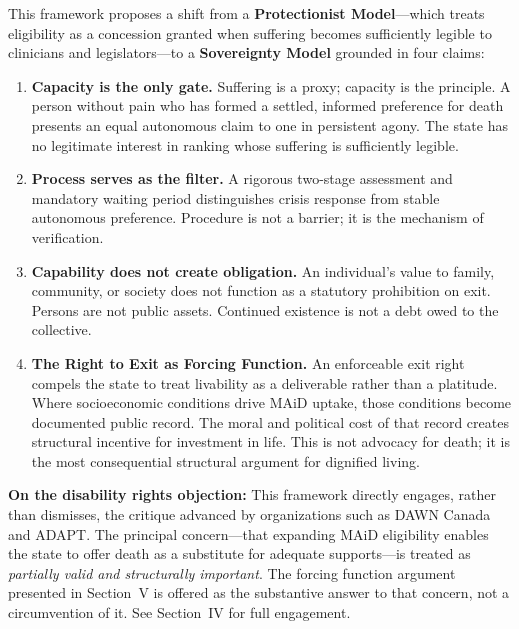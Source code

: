 \documentclass[11pt, letterpaper]{article}
\begin{document}
\medskip
This framework proposes a shift from a \textbf{Protectionist Model}---which treats eligibility
as a concession granted when suffering becomes sufficiently legible to clinicians and
legislators---to a \textbf{Sovereignty Model} grounded in four claims:

\begin{enumerate}
  \item \textbf{Capacity is the only gate.} Suffering is a proxy; capacity is the
    principle. A person without pain who has formed a settled, informed preference for
    death presents an equal autonomous claim to one in persistent agony. The state has
    no legitimate interest in ranking whose suffering is sufficiently legible.

  \item \textbf{Process serves as the filter.} A rigorous two-stage assessment and
    mandatory waiting period distinguishes crisis response from stable autonomous
    preference. Procedure is not a barrier; it is the mechanism of verification.

  \item \textbf{Capability does not create obligation.} An individual's value to
    family, community, or society does not function as a statutory prohibition on exit.
    Persons are not public assets. Continued existence is not a debt owed to the collective.

  \item \textbf{The Right to Exit as Forcing Function.} An enforceable exit right
    compels the state to treat livability as a deliverable rather than a platitude.
    Where socioeconomic conditions drive MAiD uptake, those conditions become documented
    public record. The moral and political cost of that record creates structural
    incentive for investment in life. This is not advocacy for death; it is the most
    consequential structural argument for dignified living.
\end{enumerate}

\begin{tcolorbox}[warningbox]
\textbf{On the disability rights objection:} This framework directly engages, rather than
dismisses, the critique advanced by organizations such as DAWN Canada and ADAPT. The
principal concern---that expanding MAiD eligibility enables the state to offer death as a
substitute for adequate supports---is treated as \emph{partially valid and structurally
important}. The forcing function argument presented in Section~V is offered as the
substantive answer to that concern, not a circumvention of it. See Section~IV for full
engagement.
\end{tcolorbox}
\end{document}
